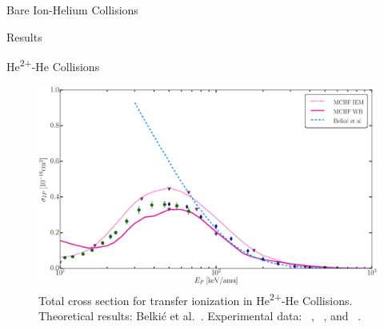 \documentclass[letterpaper, 11 pt]{report}
\begin{document}
\begin{chapter}{Bare Ion-Helium Collisions \label{chap:p-he2p-he}}
\begin{section}{Results \label{sec:phe2p-res}}
\begin{subsection}{\texorpdfstring{He\textsuperscript{2+}}{He2+}-He Collisions
                         \label{sec:he2phe-res}}
         \begin{figure}[t]
            \centering
            \includegraphics[width = 0.95 \linewidth]{./images/he2phe/he2phe-IP.eps}
            \caption[Total cross section for transfer ionization in He\textsuperscript{2+}-He
                     Collisions.]{Total cross section for transfer ionization in
                     He\textsuperscript{2+}-He Collisions. Theoretical results: Belki\'{c}
                     et al.~\cite{BMM-97}.
                     Experimental data: {\color{blue}{$\blacklozenge$}}~\cite{SG85},
                     {\color{OliveGreen}{$\bullet$}}~\cite{SG89}, and
                     {\color{RedViolet}{$\blacktriangledown$}}~\cite{Dubois87}. \label{fig:he2phe-ip}}
         \end{figure}


\end{subsection}
\end{section}
\end{chapter}
\end{document}

